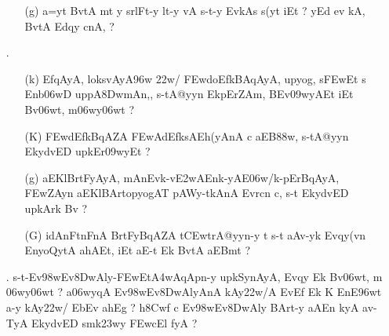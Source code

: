 \begin{itemize} 
\item[]		 \begin{itemize}
          \item[({\dn g})] {\dn a=y\?t BvtA\2 mt y srlFt-y lt-y vA s\2-t-y EvkAs\2 s\2(y\4t iEt {\rs ?\re} yEd ev kA, BvtA\2 Edqy\? cnA, {\rs ?\re}}
          \end{itemize}                                         
          
\item[{\dn \dnnum \rn{8}}.]  \begin{itemize}
   
               \item[({\dn k})] {\dn EfqAyA, loks\?vAyA\396w \322w\?/\?{\rs ,\re} \3FEwdoEfkBAqAyA, upyog, s\2\3FEwEt s\- Enb\0\306wD uppA\38DwmAn,{\rs ,\re} s\2-tA@yyn\? Ek\2pErZAm, BEv\309wyAEt iEt Bv\306wt, m\306wy\306wt\? {\rs ?\re}}  
              
              \item[({\dn K})] {\dn \3FEwd\?EfkBqAZA\2 \3FEwAd\?EfksAEh(yAnA\2 c aEB\388w\?, s\2-tA@yyn\2 EkydvED upkEr\309wyEt {\rs ?\re} }
              
              \item[({\dn g})] {\dn aEKlBrtFyAyA, mAnEvk{\rs -\re}v\4\3E2wAEnk{\rs -\re}yAE\306w/k{\rs -\re}\break\-pErBqAyA, \3FEwZAyn\?{\rs ,\re} aEKlBArtopyogAT\0 pAWy\--tkAnA\2 Evrcn\? c{\rs ,\re} s\2-t\2 EkydvED upkArk\2 Bv\? {\rs ?\re} } 
              
              \item[({\dn G})] {\dn idAnFtnFnA\2 BrtFyBqAZA t\3CEwtrA@yyn-y t\? s\2-t aAv-yk\- Evqy(v\?n EnyoQytA ahA\0Et{\rs ,\re} iEt aE-t Ek\2 BvtA aEBmt {\rs ?\re}}
                            
            \end{itemize}
 
 \item[{\dn \dnnum \rn{9}}.] {\dn s\2-t{\rs -\re}Ev\398wEv\38DwAly{\rs -\re}\3FEwEt\3A4wAqApn-y upkSynAyA, Evqy\? Ek\2 Bv\306wt, m\- \306wy\306wt\? {\rs ?\re} a\306wy\?qA\2 Ev\398wEv\38DwAlyAnA\2 kAy\0\322w\?/A  EvEf\2 Ek\2  K EnE\396wt a-y kAy\0\322w\?/\2 EbEv ah\0Eg {\rs ?\re} h\0\38Cwf\2 c Ev\398wEv\38DwAly\2 BArt-y aAEn\- kyA av-TyA EkydvED smk\323wy\2 \3FEwcEl\2 fyA {\rs ?\re}} 
   

\end{itemize}
